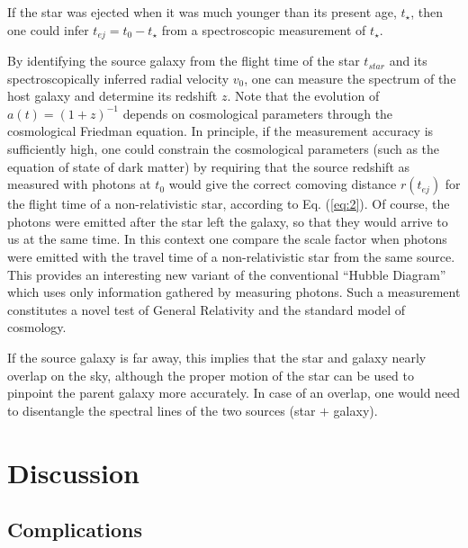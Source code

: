 \documentclass[a4paper,twocolumn]{emulateapj}
\begin{document}
If the star was ejected when it was much younger than its present age,
$t_\star$, then one could infer $t_{ej}=t_0-t_\star$ from a
spectroscopic measurement of $t_\star$. 

By identifying the source galaxy from the flight time of the star
$t_{star}$ and its spectroscopically inferred radial velocity $v_0$,
one can measure the spectrum of the host galaxy and determine its
redshift $z$. Note that the evolution of $a(t)=(1+z)^{-1}$ depends on
cosmological parameters through the cosmological Friedman equation. In
principle, if the measurement accuracy is sufficiently high, one could
constrain the cosmological parameters (such as the equation of state
of dark matter) by requiring that the source redshift as measured with
photons at $t_0$ would give the correct comoving distance $r(t_{ej})$
for the flight time of a non-relativistic star, according to
Eq. (\ref{eq:2}). Of course, the photons were emitted after the star
left the galaxy, so that they would arrive to us at the same time. In
this context one compare the scale factor when photons were emitted
with the travel time of a non-relativistic star from the same
source. This provides an interesting new variant of the conventional
``Hubble Diagram'' which uses only information gathered by measuring
photons. Such a measurement constitutes a novel test of General
Relativity and the standard model of cosmology.

If the source galaxy is far away, this implies that the star and
galaxy nearly overlap on the sky, although the proper motion of the
star can be used to pinpoint the parent galaxy more accurately. In
case of an overlap, one would need to disentangle the spectral lines
of the two sources (star $+$ galaxy).

\section{Discussion}\label{sec:discussion}
\subsection{Complications}
\end{document}
